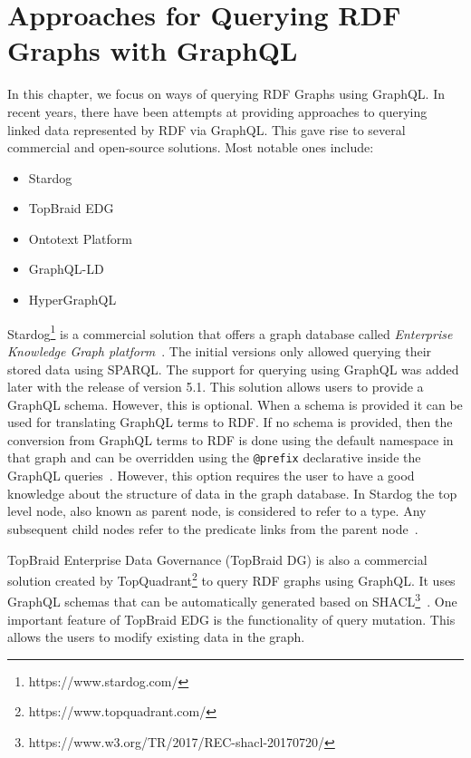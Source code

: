 \chapter{Approaches for Querying RDF Graphs with GraphQL}
\label{ch:3}
In this chapter, we focus on ways of querying RDF Graphs using GraphQL. In recent years, there have been attempts at providing approaches to querying linked data represented by RDF via GraphQL. This gave rise to several commercial and open-source solutions. Most notable ones include:

\begin{itemize}
	\item Stardog
	\item TopBraid EDG
	\item Ontotext Platform
	\item GraphQL-LD
	\item HyperGraphQL

\end{itemize}

Stardog\footnote{https://www.stardog.com/} is a commercial solution that offers a graph database called \textit{Enterprise Knowledge Graph platform}~\cite{Angele2022}. The initial versions only allowed querying their stored data using SPARQL. The support for querying using GraphQL was added later with the release of version 5.1. This solution allows users to provide a GraphQL schema. However, this is optional. When a schema is provided it can be used for translating GraphQL terms to RDF. If no schema is provided, then the conversion from GraphQL terms to RDF is done using the default namespace in that graph and can be overridden using the \texttt{@prefix} declarative inside the GraphQL queries~\cite{Taelman2019}. However, this option requires the user to have a good knowledge about the structure of data in the graph database. In Stardog the top level node, also known as parent node, is considered to refer to a type. Any subsequent child nodes refer to the predicate links from the parent node~\cite{Taelman2019}.

TopBraid Enterprise Data Governance (TopBraid DG) is also a commercial solution created by TopQuadrant\footnote{https://www.topquadrant.com/} to query RDF graphs using GraphQL. It uses GraphQL schemas that can be automatically generated based on SHACL\footnote{https://www.w3.org/TR/2017/REC-shacl-20170720/}~\cite{Taelman2019}. One important feature of TopBraid EDG is the functionality of query mutation. This allows the users to modify existing data in the graph.


